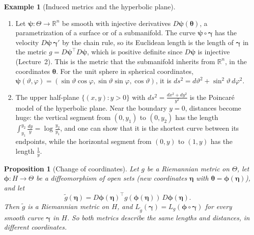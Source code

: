 \documentclass[11pt]{article}
\theoremstyle{definition}
\newtheorem{example}[definition]{Example}
\theoremstyle{plain}
\newtheorem{proposition}[definition]{Proposition}
\theoremstyle{remark}
\begin{document}
\begin{example}[Induced metrics and the hyperbolic plane]\label{ex:induced-metric}
    \begin{enumerate}
        \item Let $\boldsymbol{\psi}: \Theta \to \mathbb{R}^n$ be smooth with injective derivatives $D\boldsymbol{\psi}(\boldsymbol{\theta})$, a parametrization of a surface or of a submanifold. The curve $\boldsymbol{\psi} \circ \boldsymbol{\gamma}$ has the velocity $D\boldsymbol{\psi}\,\boldsymbol{\gamma}'$ by the chain rule, so its Euclidean length is the length of $\boldsymbol{\gamma}$ in the metric $g = D\boldsymbol{\psi}^\top D\boldsymbol{\psi}$, which is positive definite since $D\boldsymbol{\psi}$ is injective (Lecture~2). This is the metric that the submanifold inherits from $\mathbb{R}^n$, in the coordinates $\boldsymbol{\theta}$. For the unit sphere in spherical coordinates, $\boldsymbol{\psi}(\vartheta, \varphi) = (\sin\vartheta\cos\varphi, \sin\vartheta\sin\varphi, \cos\vartheta)$, it is $ds^2 = d\vartheta^2 + \sin^2\vartheta\, d\varphi^2$.
        \item The upper half-plane $\{(x, y) : y > 0\}$ with $ds^2 = \frac{dx^2 + dy^2}{y^2}$ is the Poincar\'e model of the hyperbolic plane. Near the boundary $y = 0$, distances become huge: the vertical segment from $(0, y_1)$ to $(0, y_2)$ has the length $\int_{y_1}^{y_2}\frac{dy}{y} = \log\frac{y_2}{y_1}$, and one can show that it is the shortest curve between its endpoints, while the horizontal segment from $(0, y)$ to $(1, y)$ has the length $\frac{1}{y}$.
    \end{enumerate}
\end{example}

\begin{proposition}[Change of coordinates]\label{prop:metric-coordinates}
    Let $g$ be a Riemannian metric on $\Theta$, let $\boldsymbol{\phi}: H \to \Theta$ be a diffeomorphism of open sets (new coordinates $\boldsymbol{\eta}$ with $\boldsymbol{\theta} = \boldsymbol{\phi}(\boldsymbol{\eta})$), and let
    \[\tilde g(\boldsymbol{\eta}) = D\boldsymbol{\phi}(\boldsymbol{\eta})^\top g(\boldsymbol{\phi}(\boldsymbol{\eta}))\,D\boldsymbol{\phi}(\boldsymbol{\eta}).\]
    Then $\tilde g$ is a Riemannian metric on $H$, and $L_{\tilde g}(\boldsymbol{\gamma}) = L_g(\boldsymbol{\phi} \circ \boldsymbol{\gamma})$ for every smooth curve $\boldsymbol{\gamma}$ in $H$. So both metrics describe the same lengths and distances, in different coordinates.
\end{proposition}
\end{document}
